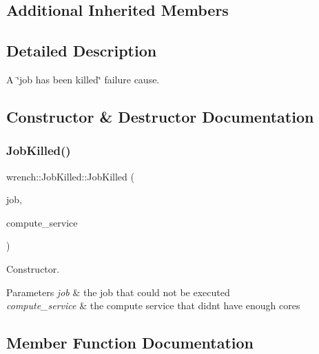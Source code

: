 \subsection*{Additional Inherited Members}


\subsection{Detailed Description}
A \char`\"{}job has been killed\char`\"{} failure cause. 

\subsection{Constructor \& Destructor Documentation}
\mbox{\label{classwrench_1_1_job_killed_ad5c0bc70d61ec91cb91e65b1facdd1b3}} 
\subsubsection{\texorpdfstring{Job\+Killed()}{JobKilled()}}
{\footnotesize\ttfamily wrench\+::\+Job\+Killed\+::\+Job\+Killed (\begin{DoxyParamCaption}\item[{\hyperlink{classwrench_1_1_workflow_job}{Workflow\+Job} $\ast$}]{job,  }\item[{\hyperlink{classwrench_1_1_compute_service}{Compute\+Service} $\ast$}]{compute\+\_\+service }\end{DoxyParamCaption})}



Constructor. 


\begin{DoxyParams}{Parameters}
{\em job} & the job that could not be executed \\
\hline
{\em compute\+\_\+service} & the compute service that didn\textquotesingle{}t have enough cores \\
\hline
\end{DoxyParams}


\subsection{Member Function Documentation}
\mbox{\label{classwrench_1_1_job_killed_a448c858885b28a03399103494ad85e5b}} 
